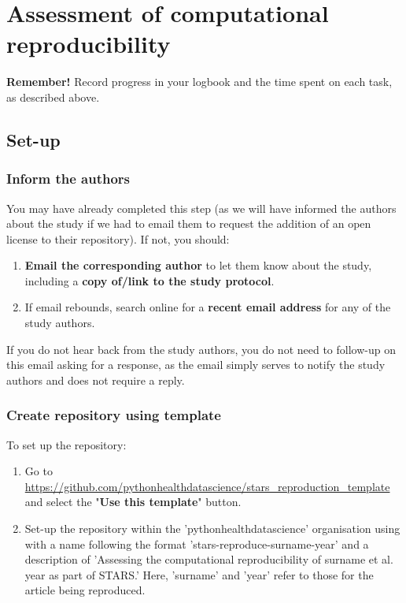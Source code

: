 \section{Assessment of computational reproducibility} \label{sec:reproduce}

\textbf{Remember!} Record progress in your logbook and the time spent on each task, as described above.

\vspace{0.5cm}
\subsection{Set-up}

\subsubsection{Inform the authors}

You may have already completed this step (as we will have informed the authors about the study if we had to email them to request the addition of an open license to their repository). If not, you should:
\begin{enumerate}
    \item \textbf{Email the corresponding author} to let them know about the study, including a \textbf{copy of/link to the study protocol}.
    \item If email rebounds, search online for a \textbf{recent email address} for any of the study authors.
\end{enumerate}

If you do not hear back from the study authors, you do not need to follow-up on this email asking for a response, as the email simply serves to notify the study authors and does not require a reply.

\vspace{0.5cm}
\subsubsection{Create repository using template}

To set up the repository:

\begin{enumerate}
    \item Go to \url{https://github.com/pythonhealthdatascience/stars_reproduction_template} and select the "\textbf{Use this template}" button.
    \item Set-up the repository within the 'pythonhealthdatascience' organisation using with a name following the format 'stars-reproduce-surname-year' and a description of 'Assessing the computational reproducibility of surname et al. year as part of STARS.' Here, 'surname' and 'year' refer to those for the article being reproduced.
\end{enumerate}

